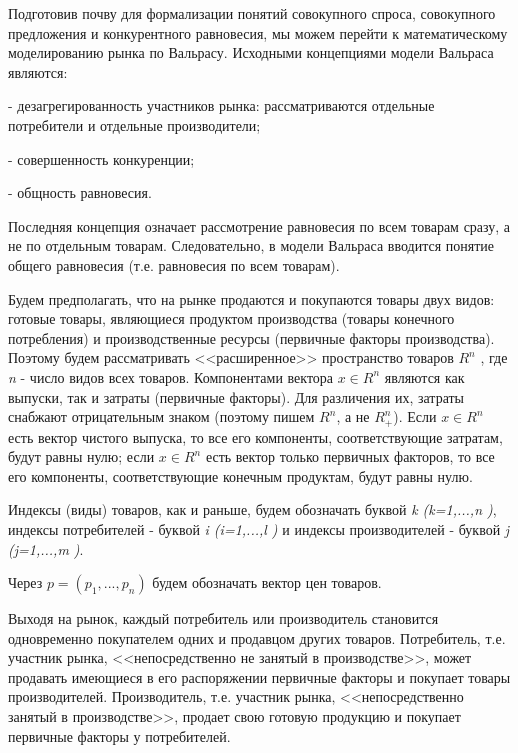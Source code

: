 \documentclass[12pt, 4paper]{book}
\begin{document}
{Подготовив почву для формализации понятий совокупного спроса, совокупного предложения и конкурентного равновесия, мы можем перейти к математическому моделированию рынка по Вальрасу. Исходными концепциями модели Вальраса являются:
\par

 - дезагрегированность участников рынка: рассматриваются отдельные потребители и отдельные производители;
\par

 - совершенность конкуренции;
\par

 - общность равновесия.
\par

Последняя концепция означает рассмотрение равновесия по всем товарам сразу, а не по отдельным товарам. Следовательно, в модели Вальраса вводится понятие общего равновесия (т.е. равновесия по всем товарам).
\par

Будем предполагать, что на рынке продаются и покупаются товары двух видов: готовые товары, являющиеся продуктом производства (товары конечного потребления) и производственные ресурсы (первичные факторы производства). Поэтому будем рассматривать <<расширенное>> пространство товаров $R^{n}$ , где \textit{n} - число видов всех товаров. Компонентами вектора $x \in R^{n}$ являются как выпуски, так и затраты (первичные факторы). Для различения их, затраты снабжают отрицательным знаком (поэтому пишем $R^{n}$, а не $R_{+}^{n}$). Если $x \in R^{n}$ есть вектор чистого выпуска, то все его компоненты, соответствующие затратам, будут равны нулю; если $x \in R^{n}$ есть вектор только первичных факторов, то все его компоненты, соответствующие конечным продуктам, будут равны нулю.
\par

Индексы (виды) товаров, как и раньше, будем обозначать буквой \textit{k (k=1,...,n )}, индексы потребителей - буквой  \textit{i (i=1,...,l )} и индексы производителей - буквой \textit{j (j=1,...,m )}. 
\par

Через $p=(p_1,...,p_n)$ будем обозначать вектор цен товаров.
\par

Выходя на рынок, каждый потребитель или производитель становится одновременно покупателем одних и продавцом других товаров. Потребитель, т.е. участник рынка, <<непосредственно не занятый в производстве>>, может продавать имеющиеся в его распоряжении первичные факторы и покупает товары производителей. Производитель, т.е. участник рынка, <<непосредственно занятый в производстве>>, продает свою готовую продукцию и покупает первичные факторы у потребителей.
\par

}
\end{document}
